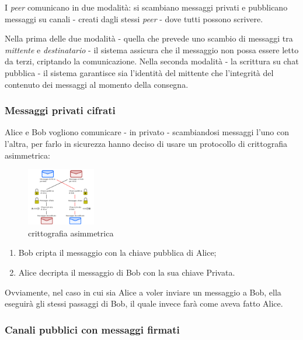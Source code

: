 \documentclass[
]{article}
\providecommand{\tightlist}{%
  \setlength{\itemsep}{0pt}\setlength{\parskip}{0pt}}
\begin{document}
I \emph{peer} comunicano in due modalità: si scambiano messaggi privati
e pubblicano messaggi su canali - creati dagli stessi \emph{peer} - dove
tutti possono scrivere.

Nella prima delle due modalità - quella che prevede uno scambio di
messaggi tra \emph{mittente} e \emph{destinatario} - il sistema assicura
che il messaggio non possa essere letto da terzi, criptando la
comunicazione. Nella seconda modalità - la scrittura su chat pubblica -
il sistema garantisce sia l'identità del mittente che l'integrità del
contenuto dei messaggi al momento della consegna.

\hypertarget{messaggi-privati-cifrati}{%
\subsubsection{Messaggi privati
cifrati}\label{messaggi-privati-cifrati}}

Alice e Bob vogliono comunicare - in privato - scambiandosi messaggi
l'uno con l'altra, per farlo in sicurezza hanno deciso di usare un
protocollo di crittografia asimmetrica:

\begin{figure}
\centering
\includegraphics[width=3cm]{../assets/310px-Crittografia_asimmetrica_schema.png}
\caption{crittografia asimmetrica}
\end{figure}

\begin{enumerate}
\def\labelenumi{\arabic{enumi}.}
\tightlist
\item
  Bob cripta il messaggio con la chiave pubblica di Alice;
\item
  Alice decripta il messaggio di Bob con la sua chiave Privata.
\end{enumerate}

Ovviamente, nel caso in cui sia Alice a voler inviare un messaggio a
Bob, ella eseguirà gli stessi passaggi di Bob, il quale invece farà come
aveva fatto Alice.

\hypertarget{canali-pubblici-con-messaggi-firmati}{%
\subsubsection{Canali pubblici con messaggi
firmati}\label{canali-pubblici-con-messaggi-firmati}}
\end{document}

